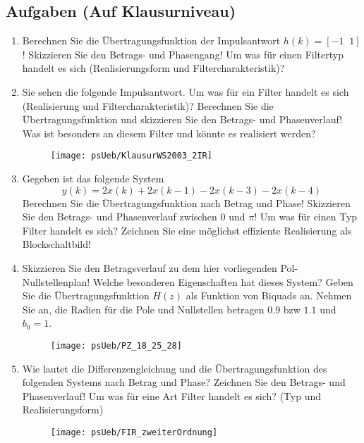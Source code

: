 \subsection{Aufgaben (Auf Klausurniveau)}
\begin{enumerate}
    \item Berechnen Sie die Übertragungsfunktion der Impulsantwort
    $h(k) = [-1 \;\; 1]$! Skizzieren Sie den Betrags- und Phasengang!
    Um was für einen Filtertyp handelt es
    sich (Realisierungsform und Filtercharakteristik)?
   \item Sie sehen die folgende Impulsantwort. Um was für ein Filter
    handelt es sich (Realisierung und Filtercharakteristik)?
    Berechnen Sie die Übertragungsfunktion und skizzieren Sie den
    Betrags- und Phasenverlauf! Was ist besonders an diesem Filter
    und könnte es realisiert werden?
    \begin{figure}[H]
    \begin{center}
    \texttt{[image: psUeb/KlausurWS2003\_2IR]}
    \end{center}
    \end{figure}
    \item Gegeben ist das folgende System
    \[
        y(k) = 2x(k) + 2x(k-1) - 2x(k-3) - 2x(k-4)
    \]
    Berechnen Sie die Übertragungsfunktion nach Betrag und Phase! Skizzieren Sie
    den Betrags- und Phasenverlauf zwischen 0 und $\pi$! Um was für einen Typ Filter handelt es sich?
    Zeichnen Sie eine möglichst effiziente Realisierung als Blockschaltbild!

    \item Skizzieren Sie den Betragsverlauf zu dem hier vorliegenden Pol-Nullstellenplan! Welche
    besonderen Eigenschaften hat dieses System? Geben Sie die Übertragungsfunktion $H(z)$ als Funktion von
    Biquads an. Nehmen Sie an, die Radien für die Pole und Nullstellen betragen $0.9$ bzw $1.1$ und $b_0 = 1$.
    \begin{figure}[H]
    \begin{center}
    \texttt{[image: psUeb/PZ\_18\_25\_28]}
    \end{center}
    \end{figure}
    \item Wie lautet die Differenzengleichung und die
    Übertragungsfunktion des folgenden Systems
    nach Betrag und Phase? Zeichnen Sie den Betrags- und Phasenverlauf!
    Um was für eine Art Filter handelt es sich?
    (Typ und Realisierungsform)
    \begin{figure}[H]
    \begin{center}
    \texttt{[image: psUeb/FIR\_zweiterOrdnung]}
    \end{center}
    \end{figure}

\end{enumerate}
